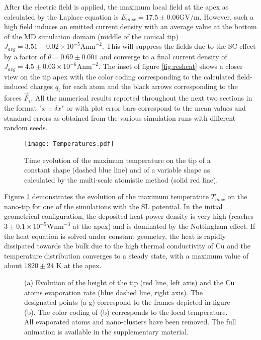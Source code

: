 \documentclass[%
 aps,
 prb,%
 amsmath,amssymb,
reprint,%
superscriptaddress,
]{revtex4-1}
\begin{document}
After the electric field is applied, the maximum local field at the apex as calculated by the Laplace equation is $E_{max} = 17.5 \pm 0.06 \textrm{GV/m}$.
However, such a high field induces an emitted current density with an average value at the bottom of the MD simulation domain (middle of the conical tip) $J_{avg} = 3.51 \pm 0.02 \times 10^{-5} \textrm{Anm}^{-2}$.
This will suppress the fields due to the SC effect by a factor of $\theta = 0.69 \pm 0.001$ and converge to a final current density of $J_{avg} = 4.5 \pm 0.03 \times 10^{-6} \textrm{Anm}^{-2}$. The inset of figure \ref{fig:resheat} shows a closer view on the tip apex with the color coding corresponding to the calculated field-induced charges $q_i$ for each atom and the black arrows corresponding to the forces $\vec{F}_i$. 
All the numerical results reported throughout the next two sections in the format "$x \pm \delta x$" or with plot error bars correspond to the mean values and standard errors as obtained from the various simulation runs with different random seeds.

\begin{figure}[htbp]
	\centering
	\texttt{[image: Temperatures.pdf]}
    \caption{Time evolution of the maximum temperature on the tip of a constant shape (dashed blue line) and of a variable shape as calculated by the multi-scale atomistic method (solid red line).} 
    \label{fig:temperatures}
\end{figure}


Figure \ref{fig:temperatures} demonstrates the evolution of the maximum temperature $T_{max}$ on the nano-tip for one of the simulations with the SL potential.
In the initial geometrical configuration, the deposited heat power density is very high (reaches $3 \pm 0.1 \times 10^{-5} \textrm{Wnm}^{-3}$ at the apex) and is dominated by the Nottingham effect.
If the heat equation is solved under constant geometry, the heat is rapidly dissipated towards the bulk due to the high thermal conductivity of Cu and the temperature distribution converges to a steady state, with a maximum value of about $1820 \pm 24$ K at the apex.

\begin{figure}[htbp]
	\centering


	\caption{\label{fig:evolution} (a) Evolution of the height of the tip (red line, left axis) and the Cu atoms evaporation rate (blue dashed line, right axis). The designated points (a-g) correspond to the frames depicted in figure (b). The color coding of (b) corresponds to the local temperature. All evaporated atoms and nano-clusters have been removed. The full animation is available in the supplementary material.}
\end{figure}
\end{document}
